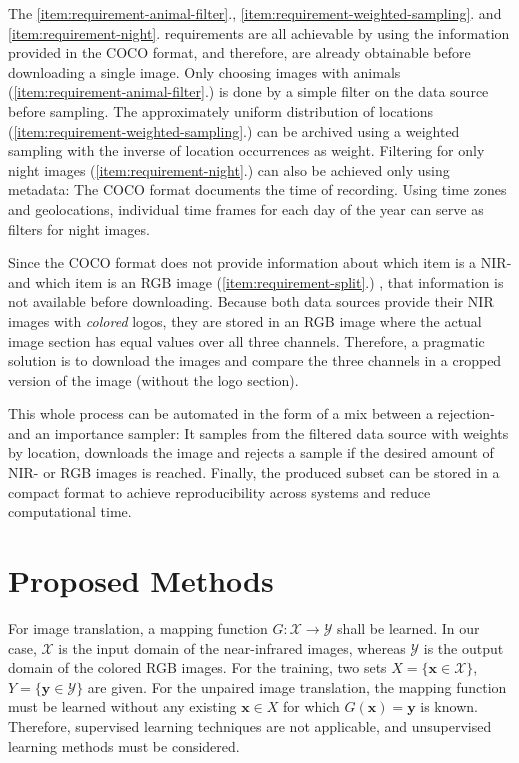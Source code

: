 \documentclass[a4paper,11pt, DIV=12]{scrartcl}
\newcommand{\x}{\boldsymbol{x}}
\newcommand{\y}{\boldsymbol{y}}
\begin{document}
The \ref{item:requirement-animal-filter}., \ref{item:requirement-weighted-sampling}. and \ref{item:requirement-night}. requirements are all achievable by using the information provided in the COCO format, and therefore,
are already obtainable before downloading a single image.
Only choosing images with animals (\ref{item:requirement-animal-filter}.) is done by a simple filter on the data source before sampling.
The approximately uniform distribution of locations (\ref{item:requirement-weighted-sampling}.) can be archived using a weighted sampling with the inverse of location occurrences as weight.
Filtering for only night images (\ref{item:requirement-night}.) can also be achieved only using metadata:
The COCO format documents the time of recording. Using time zones and geolocations, individual time frames for each day of the year can serve as filters for night images.

Since the COCO format does not provide information about which item is a NIR- and which item is an RGB image (\ref{item:requirement-split}.) \cite{caltech}, that information is not available before downloading.
Because both data sources provide their NIR images with \textit{colored} logos, they are stored in an RGB image where the actual image section has equal values over all three channels.
Therefore, a pragmatic solution is to download the images and compare the three channels in a cropped version of the image (without the logo section).

This whole process can be automated in the form of a mix between a rejection- and an importance sampler:
It samples from the filtered data source with weights by location, downloads the image and rejects a sample if the desired amount of NIR- or RGB images is reached.
Finally, the produced subset can be stored in a compact format to achieve reproducibility across systems and reduce computational time.

\section{Proposed Methods}

For image translation, a mapping function $G: \mathcal{X} \to \mathcal{Y}$ shall be learned.
In our case, $\mathcal{X}$ is the input domain of the near-infrared images, whereas $\mathcal{Y}$ is the output domain of the colored RGB images.
For the training, two sets $X = \{\x \in \mathcal{X}\}$, $Y = \{\y \in \mathcal{Y}\}$ are given.
For the unpaired image translation, the mapping function must be learned without any existing $\x \in X$ for which $G(\x)=\y$ is known.
Therefore, supervised learning techniques are not applicable, and unsupervised learning methods must be considered.
\end{document}
